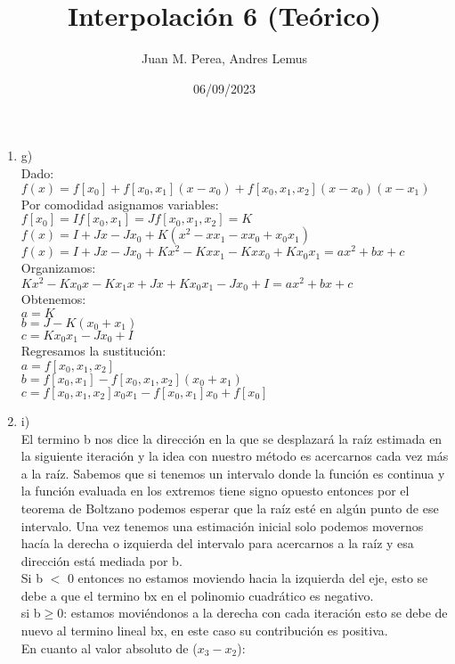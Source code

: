 \documentclass{article}
\title{Interpolación 6 (Teórico)}
\author{Juan M. Perea, Andres Lemus}
\date{06/09/2023}
\begin{document}
\maketitle

 \begin{enumerate}
\renewcommand{\theenumi}{\roman{enumi}}
\item g)\\
	Dado:\\
	$f(x)=f[x_0]+f[x_0,x_1](x-x_0)+f[x_0,x_1,x_2](x-x_0)(x-x_1)$\\
	Por comodidad asignamos variables:\\
	$f[x_0]=I f[x_0,x_1]=J f[x_0,x_1,x_2]=K$\\
	$f(x)=I+Jx-Jx_0+K(x^2-xx_1-xx_0+x_0x_1)$\\
	$f(x)=I+Jx-Jx_0+Kx^2-Kxx_1-Kxx_0+Kx_0x_1=ax^2+bx+c$\\
	Organizamos:\\
	$Kx^2-Kx_0x-Kx_1x+Jx+Kx_0x_1-Jx_0+I=ax^2+bx+c$\\
	Obtenemos:\\
	$a=K$\\
	$b=J-K(x_0+x_1)$\\
	$c=Kx_0x_1-Jx_0+I$\\
	Regresamos la sustitución:\\
	$a=f[x_0,x_1,x_2]$\\
	$b=f[x_0,x_1]-f[x_0,x_1,x_2](x_0+x_1)$\\
	$c=f[x_0,x_1,x_2]x_0x_1-f[x_0,x_1]x_0+f[x_0]$
\item i)\\
El termino b nos dice la dirección en la que se desplazará la raíz estimada en la siguiente iteración y la idea con nuestro método es acercarnos cada vez más a la raíz. Sabemos que si tenemos un intervalo donde la función es continua y la función evaluada en los extremos tiene signo opuesto entonces por el teorema de Boltzano podemos esperar que la raíz esté en algún punto de ese intervalo. Una vez tenemos una estimación inicial solo podemos movernos hacía la derecha o izquierda del intervalo para acercarnos a la raíz y esa dirección está mediada por b. \\
Si b $<$ 0 entonces no estamos moviendo hacia la izquierda del eje, esto se debe a que el termino bx en el polinomio cuadrático es negativo.\\
si b$\geq$0: estamos moviéndonos a la derecha con cada iteración esto se debe de nuevo al termino lineal bx, en este caso su contribución es positiva.\\
En cuanto al valor absoluto de ($x_3 -x_2$):\\

\end{enumerate}
\end{document}

